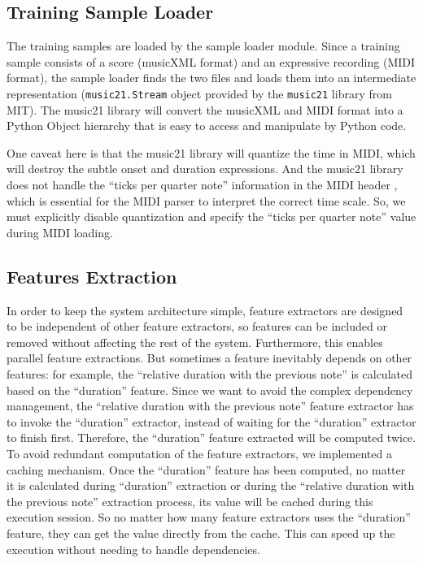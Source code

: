 
\subsection{Training Sample Loader}
   The training samples are loaded by the sample loader module. Since a training sample  consists of a score (musicXML format) and an expressive recording (MIDI format), the sample loader finds the two files and loads them into an intermediate representation (\texttt{music21.Stream} object provided by the \texttt{music21} library \cite{music21} from MIT). The music21 library will convert the musicXML and MIDI format into a Python Object hierarchy that is easy to access and manipulate by Python code. 

   One caveat here is that the music21 library will quantize the time in MIDI, which will destroy the subtle onset and duration expressions. And the music21 library does not handle the \enquote{ticks per quarter note} information in the MIDI header \cite{midispec}, which is essential for the MIDI parser to interpret the correct time scale. So, we must explicitly disable quantization and specify the \enquote{ticks per quarter note} value during MIDI loading.

\subsection{Features Extraction}
In order to keep the system architecture simple, feature extractors are designed to be independent of other feature extractors, so features can be included or removed without affecting the rest of the system. Furthermore, this enables parallel feature extractions. But sometimes a feature inevitably depends on other features: for example, the \enquote{relative duration with the previous note} is calculated based on the \enquote{duration} feature. Since we want to avoid the complex dependency management, the \enquote{relative duration with the previous note} feature extractor has to invoke the \enquote{duration} extractor, instead of waiting for the \enquote{duration} extractor to finish first. Therefore, the \enquote{duration} feature extracted will be computed twice. To avoid redundant computation of the feature extractors, we implemented a caching mechanism. Once the \enquote{duration} feature has been computed, no matter it is calculated during \enquote{duration} extraction or during the \enquote{relative duration with the previous note} extraction process, its value will be cached during this execution session. So no matter how many feature extractors uses the \enquote{duration} feature, they can get the value directly from the cache. This can speed up the execution without needing to handle dependencies.

